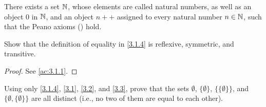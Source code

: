 \begin{ax}[Infinity]\label{3.7}
  There exists a set \(\mathbb{N}\), whose elements are called natural numbers, as well as an object \(0\) in \(\mathbb{N}\), and an object \(n++\) assigned to every natural number \(n \in \mathbb{N}\), such that the Peano axioms () hold.
\end{ax}

\exercisesection

\begin{ex}\label{ex:3.1.1}
  Show that the definition of equality in \cref{3.1.4} is reflexive, symmetric, and transitive.
\end{ex}

\begin{proof}
  See \cref{ac:3.1.1}.
\end{proof}

\begin{ex}\label{ex:3.1.2}
  Using only \cref{3.1.4}, \cref{3.1}, \cref{3.2}, and \cref{3.3}, prove that the sets \(\emptyset\), \(\{\emptyset\}\), \(\{\{\emptyset\}\}\), and \(\{\emptyset, \{\emptyset\}\}\) are all distinct
  (i.e., no two of them are equal to each other).
\end{ex}

